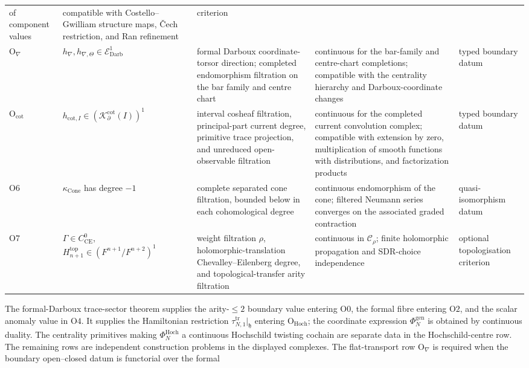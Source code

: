 \begin{thm}
\begin{center}
\begin{tabular}{@{}p{}|p{}|p{}|p{}|p{}@{}}
of component values &
compatible with Costello--Gwilliam structure maps, Čech restriction, and
Ran refinement &
criterion\\
\(\mathrm{O}_{\nabla}\) &
\(h_{\nabla},h_{\nabla,\Theta}\in
\mathcal E^1_{\mathrm{Darb}}\) &
formal Darboux coordinate-torsor direction; completed endomorphism
filtration on the bar family and centre chart &
continuous for the bar-family and centre-chart completions; compatible
with the centrality hierarchy and Darboux-coordinate changes &
typed boundary datum\\
\(\mathrm{O}_{\mathrm{cot}}\) &
\(h_{\mathrm{cot},I}\in
(\mathcal K^{\mathrm{cot}}_\partial(I))^1\) &
interval cosheaf filtration, principal-part current degree, primitive
trace projection, and unreduced open-observable filtration &
continuous for the completed current convolution complex; compatible
with extension by zero, multiplication of smooth functions with
distributions, and factorization products &
typed boundary datum\\
\(\mathrm{O6}\) &
\(\kappa_{\operatorname{Cone}}\) has degree \(-1\) &
complete separated cone filtration, bounded below in each cohomological
degree &
continuous endomorphism of the cone; filtered Neumann series converges on
the associated graded contraction &
quasi-isomorphism datum\\
\(\mathrm{O7}\) &
\(\Gamma\in C^0_{\mathrm{CE}}\), \(H^{\mathrm{top}}_{n+1}\in(F^{n+1}/F^{n+2})^1\) &
weight filtration \(\rho\), holomorphic-translation Chevalley--Eilenberg
degree, and topological-transfer arity filtration &
continuous in \(\mathcal C_\rho\); finite holomorphic propagation and
SDR-choice independence &
optional topologisation criterion
\end{tabular}
\end{center}
The formal-Darboux trace-sector theorem supplies the arity-\(\le2\)
boundary value entering \(\mathrm{O0}\), the formal fibre entering
\(\mathrm{O2}\), and the scalar anomaly value in \(\mathrm{O4}\).  It
supplies the Hamiltonian restriction
\(\tau_{N,1}^{\mathrm{tr}}|_{\mathfrak h}\) entering
\(\mathrm{O}_{\mathrm{Hoch}}\); the coordinate expression
\(\Phi_N^{\mathrm{gen}}\) is obtained by continuous duality.  The
centrality primitives making \(\Phi_N^{\mathrm{Hoch}}\) a continuous
Hochschild twisting cochain are separate
data in the Hochschild-centre row.  The
remaining rows are independent construction problems in the displayed
complexes.  The flat-transport row \(\mathrm{O}_{\nabla}\) is required
when the boundary open--closed datum is functorial over the formal

\end{thm}
